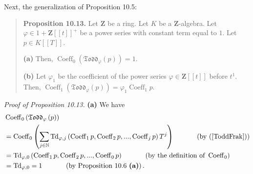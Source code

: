\documentclass[numbers=enddot,12pt,final,onecolumn,notitlepage]{scrartcl}%
\begin{document}
Next, the generalization of Proposition 10.5:

\begin{quote}
\textbf{Proposition 10.13.} Let $\mathbf{Z}$ be a ring. Let $K$ be a
$\mathbf{Z}$-algebra. Let $\varphi\in1+\mathbf{Z}\left[  \left[  t\right]
\right]  ^{+}$ be a power series with constant term equal to $1$. Let $p\in
K\left[  \left[  T\right]  \right]  $.

\textbf{(a)} Then, $\operatorname*{Coeff}\nolimits_{0}\left(  \mathfrak{Todd}%
_{\varphi}\left(  p\right)  \right)  =1$.

\textbf{(b)} Let $\varphi_{1}$ be the coefficient of the power series
$\varphi\in\mathbf{Z}\left[  \left[  t\right]  \right]  $ before $t^{1}$.
Then, $\operatorname*{Coeff}\nolimits_{1}\left(  \mathfrak{Todd}_{\varphi
}\left(  p\right)  \right)  =\varphi_{1}\operatorname*{Coeff}\nolimits_{1}p$.
\end{quote}

\textit{Proof of Proposition 10.13.} \textbf{(a)} We have%
\begin{align*}
&  \operatorname*{Coeff}\nolimits_{0}\left(  \mathfrak{Todd}_{\varphi}\left(
p\right)  \right) \\
&  =\operatorname*{Coeff}\nolimits_{0}\left(  \sum_{j\in\mathbb{N}%
}\operatorname*{Td}\nolimits_{\varphi,j}\left(  \operatorname*{Coeff}%
\nolimits_{1}p,\operatorname*{Coeff}\nolimits_{2}p,...,\operatorname*{Coeff}%
\nolimits_{j}p\right)  T^{j}\right)  \ \ \ \ \ \ \ \ \ \ \left(  \text{by
(\ref{ToddFrak})}\right) \\
&  =\operatorname*{Td}\nolimits_{\varphi,0}\left(  \operatorname*{Coeff}%
\nolimits_{1}p,\operatorname*{Coeff}\nolimits_{2}p,...,\operatorname*{Coeff}%
\nolimits_{0}p\right)  \ \ \ \ \ \ \ \ \ \ \left(  \text{by the definition of
}\operatorname*{Coeff}\nolimits_{0}\right) \\
&  =\operatorname*{Td}\nolimits_{\varphi,0}=1\ \ \ \ \ \ \ \ \ \ \left(
\text{by Proposition 10.6 \textbf{(a)}}\right)  .
\end{align*}
\end{document}
